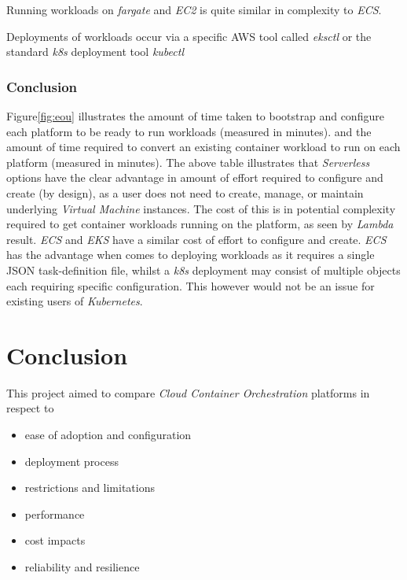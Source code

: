 Running workloads on \textit{fargate} and \textit{EC2} is quite similar in complexity to \textit{ECS}.

Deployments of workloads occur via a specific AWS tool called \emph{eksctl}\cite{weaveworks} or the standard \textit{k8s} deployment tool \emph{kubectl}\cite{kubernetes}

\subsection*{Conclusion}
Figure\ref{fig:eou} illustrates the amount of time taken to bootstrap and configure each platform to be ready to run workloads (measured in minutes).
and the amount of time required to convert an existing container workload to run on each platform (measured in minutes).
The above table illustrates that \textit{Serverless} options have the clear advantage in amount of effort required to configure and create (by design), as a user does not need to
create, manage, or maintain underlying \textit{Virtual Machine} instances. The cost of this is in potential complexity required to get container workloads running on the
platform, as seen by \textit{Lambda} result.
\textit{ECS} and \textit{EKS} have a similar cost of effort to configure and create. \textit{ECS} has the advantage when comes to deploying workloads as it requires a
single JSON task-definition file, whilst a \textit{k8s} deployment may consist of multiple objects each requiring specific configuration.
This however would not be an issue for existing users of \textit{Kubernetes}.

\chapter{Conclusion}

This project aimed to compare \emph{Cloud Container Orchestration} platforms in respect to
\begin{itemize}
      \item ease of adoption and configuration
      \item deployment process
      \item restrictions and limitations
      \item performance
      \item cost impacts
      \item reliability and resilience
\end{itemize}

